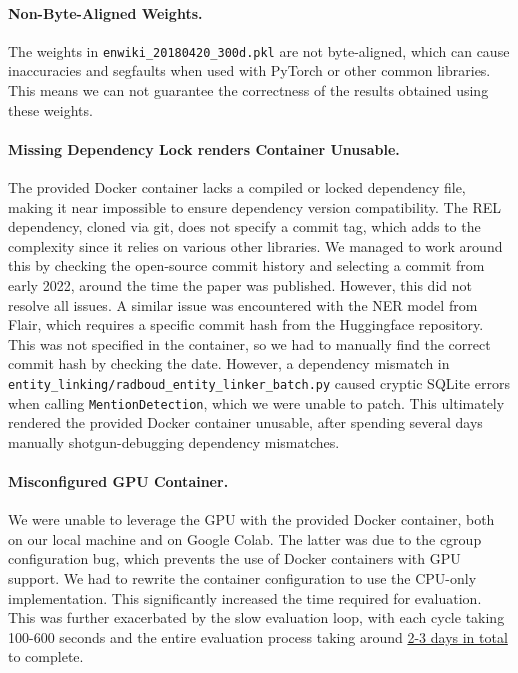 \documentclass[manuscript]{acmart}
\begin{document}
\paragraph{Non-Byte-Aligned Weights.} The weights in \texttt{enwiki\_20180420\_300d.pkl} are not byte-aligned, which can cause inaccuracies and segfaults when used with PyTorch or other common libraries. This means we can not guarantee the correctness of the results obtained using these weights.

\paragraph{Missing Dependency Lock renders Container Unusable.} The provided Docker container lacks a compiled or locked dependency file, making it near impossible to ensure dependency version compatibility. The REL dependency, cloned via git, does not specify a commit tag, which adds to the complexity since it relies on various other libraries. We managed to work around this by checking the open-source commit history and selecting a commit from early 2022, around the time the paper was published. However, this did not resolve all issues. A similar issue was encountered with the NER model from Flair, which requires a specific commit hash from the Huggingface repository. This was not specified in the container, so we had to manually find the correct commit hash by checking the date. However, a dependency mismatch in \texttt{entity\_linking/radboud\_entity\_linker\_batch.py} caused cryptic SQLite errors when calling \texttt{MentionDetection}, which we were unable to patch. This ultimately rendered the provided Docker container unusable, after spending several days manually shotgun-debugging dependency mismatches.

\paragraph{Misconfigured GPU Container.} We were unable to leverage the GPU with the provided Docker container, both on our local machine and on Google Colab. The latter was due to the cgroup configuration bug, which prevents the use of Docker containers with GPU support. We had to rewrite the container configuration to use the CPU-only implementation. This significantly increased the time required for evaluation. This was further exacerbated by the slow evaluation loop, with each cycle taking 100-600 seconds and the entire evaluation process taking around \underline{2-3 days in total} to complete.
\end{document}
